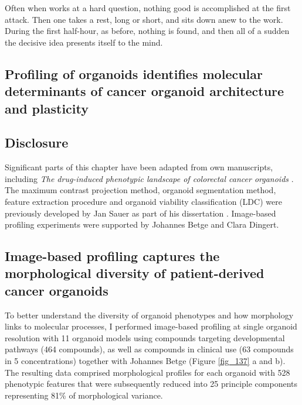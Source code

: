 \begin{savequote}[75mm]
Often when works at a hard question, nothing good is accomplished at the first attack. Then one takes a rest, long or short, and sits down anew to the work. During the first half-hour, as before, nothing is found, and then all of a sudden the decisive idea presents itself to the mind.
\end{savequote}

\begin{flushleft}
\chapter{Profiling of organoids identifies molecular determinants of cancer organoid architecture and plasticity}

\newpage


\section{Disclosure}
Significant parts of this chapter have been adapted from own manuscripts, including \textit{The drug-induced phenotypic landscape of colorectal cancer organoids} \cite{Betge2022-kr}. The maximum contrast projection method, organoid segmentation method, feature extraction procedure and organoid viability classification (LDC) were previously developed by Jan Sauer as part of his dissertation \cite{noauthor_undated-ij}. Image-based profiling experiments were supported by Johannes Betge and Clara Dingert. 

\section{Image-based profiling captures the morphological diversity of patient-derived cancer organoids}

To better understand the diversity of organoid phenotypes and how morphology links to molecular processes, I performed image-based profiling at single organoid resolution with 11 organoid models using compounds targeting developmental pathways (464 compounds), as well as compounds in clinical use (63 compounds in 5 concentrations) together with Johannes Betge (Figure \ref{fig_137} a and b). The resulting data comprised morphological profiles for each organoid with 528 phenotypic features  that were subsequently reduced into 25 principle components representing 81\% of morphological variance.


\end{flushleft}
